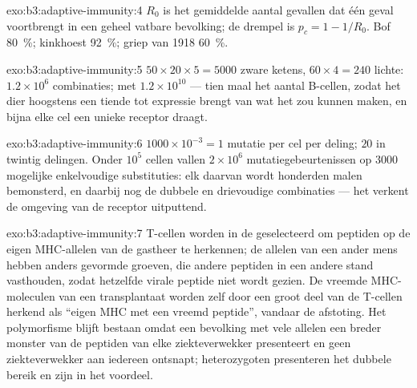 \begin{solution}{exo:b3:adaptive-immunity:4}
$R_{0}$ is het gemiddelde aantal gevallen dat één geval voortbrengt in
een geheel vatbare bevolking; de drempel is $p_{c} = 1 - 1/R_{0}$. Bof
\qty{80}{\%}; kinkhoest \qty{92}{\%}; griep van 1918 \qty{60}{\%}.
\end{solution}

\begin{solution}{exo:b3:adaptive-immunity:5}
$50\times 20\times 5 = 5000$ zware ketens, $60\times 4 = 240$ lichte:
$1.2\times 10^{6}$ combinaties; met  $1.2\times
10^{10}$ --- tien maal het aantal B-cellen, zodat het dier hoogstens
een tiende tot expressie brengt van wat het zou kunnen maken, en bijna
elke cel een unieke receptor draagt.
\end{solution}

\begin{solution}{exo:b3:adaptive-immunity:6}
$1000\times 10^{-3} = 1$ mutatie per cel per deling; $20$ in twintig
delingen. Onder $10^{5}$ cellen vallen $2\times 10^{6}$
mutatiegebeurtenissen op $3000$ mogelijke enkelvoudige substituties:
elk daarvan wordt honderden malen bemonsterd, en daarbij nog de dubbele
en drievoudige combinaties --- het  verkent de omgeving van
de receptor uitputtend.
\end{solution}

\begin{solution}{exo:b3:adaptive-immunity:7}
T-cellen worden in de  geselecteerd om peptiden op de eigen
MHC-allelen van de gastheer te herkennen; de allelen van een ander mens
hebben anders gevormde groeven, die andere peptiden in een andere stand
vasthouden, zodat hetzelfde virale peptide niet wordt gezien. De vreemde
MHC-moleculen van een transplantaat worden zelf door een groot deel van
de T-cellen herkend als ``eigen MHC met een vreemd peptide'', vandaar de
afstoting. Het polymorfisme blijft bestaan omdat een bevolking met vele
allelen een breder monster van de peptiden van elke ziekteverwekker
presenteert en geen ziekteverwekker aan iedereen ontsnapt;
heterozygoten presenteren het dubbele bereik en zijn in het voordeel.
\end{solution}

